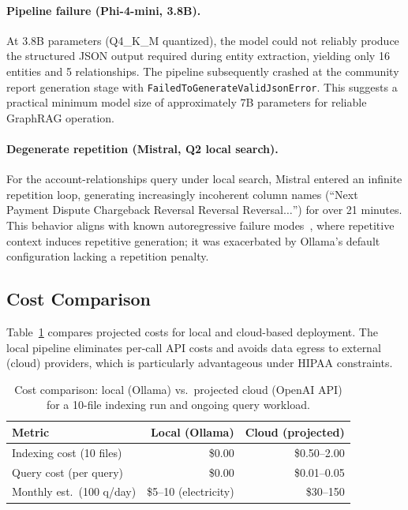 \documentclass{article}
\begin{document}
\paragraph{Pipeline failure (Phi-4-mini, 3.8B).}
At 3.8B parameters (Q4\_K\_M quantized), the model could not reliably produce the structured JSON output required during entity extraction, yielding only 16 entities and 5 relationships. The pipeline subsequently crashed at the community report generation stage with \texttt{FailedToGenerateValidJsonError}. This suggests a practical minimum model size of approximately 7B parameters for reliable GraphRAG operation.

\paragraph{Degenerate repetition (Mistral, Q2 local search).}
For the account-relationships query under local search, Mistral entered an infinite repetition loop, generating increasingly incoherent column names
(``Next Payment Dispute Chargeback Reversal Reversal Reversal$\ldots$'') for over 21 minutes. This behavior aligns with known autoregressive failure modes~\cite{ji2023survey}, where repetitive context induces repetitive generation; it was exacerbated by Ollama's default configuration
lacking a repetition penalty.

\subsection{Cost Comparison}

Table~\ref{tab:cost} compares projected costs for local and cloud-based deployment. The local pipeline eliminates per-call API costs and avoids data egress to external (cloud) providers, which is particularly advantageous under HIPAA constraints.

\begin{table}[h]
  \caption{Cost comparison: local (Ollama) vs.\ projected cloud (OpenAI API) for a 10-file indexing run and ongoing query workload.}
  \label{tab:cost}
  \centering
  \begin{tabular}{lrr}
    \toprule
    Metric                       & Local (Ollama)        & Cloud (projected)  \\
    \midrule
    Indexing cost (10 files)     & \$0.00                & \$0.50--2.00       \\
    Query cost (per query)       & \$0.00                & \$0.01--0.05       \\
    Monthly est.\ (100 q/day)    & \$5--10 (electricity) & \$30--150          \\
    \bottomrule
  \end{tabular}
\end{table}
\end{document}
